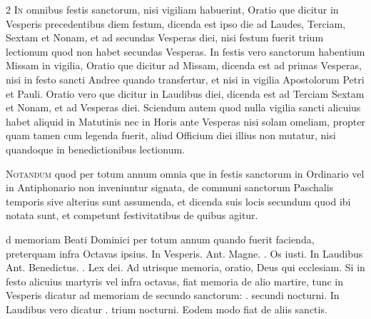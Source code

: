\begin{multicols*}{2}
{\color{Red} }
\lettrine[lines=2]{\zallmancaps \color{Red} I}{n} omnibus festis sanctorum, nisi vigiliam habuerint, Oratio que dicitur in Vesperis precedentibus diem festum, dicenda est ipso die ad Laudes, Terciam, Sextam et Nonam, et ad secundas Vesperas diei, nisi festum fuerit trium lectionum quod non habet secundas Vesperas.
In festis vero sanctorum habentium Missam in vigilia, Oratio que dicitur ad Missam, dicenda est ad primas Vesperas, nisi in festo sancti Andree quando transfertur, et nisi in vigilia Apostolorum Petri et Pauli.
Oratio vero que dicitur in Laudibus diei, dicenda est ad Terciam Sextam et Nonam, et ad Vesperas diei. Sciendum autem quod nulla vigilia sancti alicuius habet aliquid in Matutinis nec in Horis ante Vesperas nisi solam omeliam, propter quam tamen cum legenda fuerit, aliud Officium diei illius non mutatur, nisi quandoque in benedictionibus lectionum.

{\color{Red} }
\lettrine[lines=2]{\zallmancaps \color{Blue} N}{otandum} quod per totum annum omnia que in festis sanctorum in Ordinario vel in Antiphonario non inveniuntur signata, de communi sanctorum Paschalis temporis sive alterius sunt assumenda, et dicenda suis locis secundum quod ibi notata sunt, et competunt festivitatibus de quibus agitur.




\par {}d memoriam Beati Dominici per totum annum quando fuerit facienda, preterquam infra Octavas ipsius.
In Vesperis. Ant. Magne. \Vbar . Os iusti. In Laudibus Ant. Benedictus. \Vbar . Lex dei. Ad utrisque memoria, oratio, Deus qui ecclesiam.
Si in festo alicuius martyris vel infra octavas, fiat memoria de alio martire, tunc in Vesperis dicatur ad memoriam de secundo sanctorum: \Vbar . secundi nocturni. In Laudibus vero dicatur \Vbar . trium nocturni. Eodem modo fiat de aliis sanctis.


\end{multicols*}
